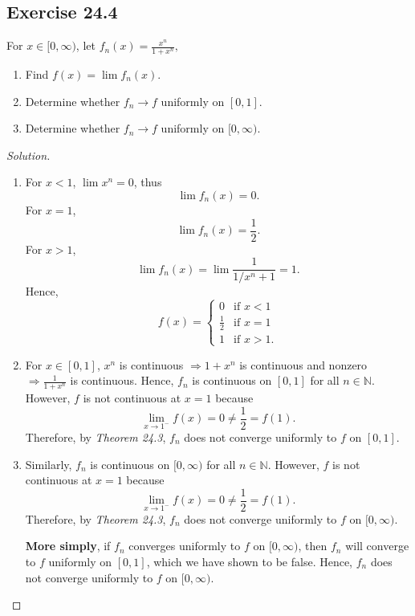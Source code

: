 \documentclass{article}
\renewcommand*{\implies}{\ensuremath{\Longrightarrow}}
\newcommand*{\N}{\ensuremath{\mathbb{N}}}
\begin{document}
\newpage
\subsection*{Exercise 24.4}
For $x\in[0,\infty)$, let $f_n(x)=\frac{x^n}{1+x^n},$\begin{enumerate}[label=\textbf{(\alph*)}]
    \item Find $f(x)=\lim f_n(x)$.
    \item Determine whether $f_n\to f$ uniformly on $[0,1]$.
    \item Determine whether $f_n\to f$ uniformly on $[0,\infty)$.
\end{enumerate}
\begin{proof}[Solution]\indent
    \begin{enumerate}[label=\textbf{(\alph*)}]
        \item For $x<1$, $\lim x^n=0$, thus $$\lim f_n(x)=0.$$ For $x=1$, 
        $$\lim f_n(x)=\frac{1}{2}.$$
        For $x>1$, 
        $$\lim f_n(x)=\lim \frac{1}{1/x^n+1} = 1.$$
        Hence, $$f(x)=\begin{cases}
            0 & \text{if }x<1 \\
            \frac{1}{2} & \text{if }x=1 \\
            1 & \text{if }x>1.
        \end{cases}$$

        \item For $x\in[0,1]$, $x^n$ is continuous $\implies 1+ x^n$ is continuous and nonzero 
        $\implies \frac{1}{1+x^n}$ is continuous. Hence, $f_n$ is continuous on $[0,1]$ for 
        all $n\in\N$. However, $f$ is not continuous at $x=1$ because 
        $$\lim_{x\to 1^-}f(x)=0\ne \frac{1}{2}=f(1).$$ Therefore, by \emph{Theorem 24.3},
        $f_n$ does not converge uniformly to $f$ on $[0,1]$.

        \item Similarly, $f_n$ is continuous on $[0,\infty)$ for all $n\in\N$. However,
        $f$ is not continuous at $x=1$ because
        $$\lim_{x\to 1^-}f(x)=0\ne \frac{1}{2}=f(1).$$ Therefore, by \emph{Theorem 24.3},
        $f_n$ does not converge uniformly to $f$ on $[0,\infty)$.

        \textbf{More simply}, if $f_n$ converges uniformly to $f$ on $[0,\infty)$, then
        $f_n$ will converge to $f$ uniformly on $[0,1]$, which we have shown to be false. 
        Hence, $f_n$ does not converge uniformly to $f$ on $[0,\infty)$.
    \end{enumerate}
    
\end{proof}
\end{document}
